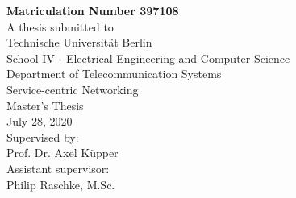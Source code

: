 \begin{titlepage}
\begin{center}
		\textbf{Matriculation Number 397108}\\
		\vspace{2cm}
	 	A thesis submitted to\\
		\vspace{0.5cm}
		Technische Universität Berlin\\
		School IV - Electrical Engineering and Computer Science\\
		Department of Telecommunication Systems\\
		Service-centric Networking\\
		\vspace{0.5cm}
		Master's Thesis\\
		\vspace{2.2cm}
		July 28, 2020\\
		\vspace{2.0cm}
		\large
		Supervised by:\\
		Prof. Dr. Axel Küpper\\
		\vspace{1cm}
		Assistant supervisor:\\
		Philip Raschke, M.Sc.
		\end{center}
\end{titlepage}

\shipout\null
\shipout\null
